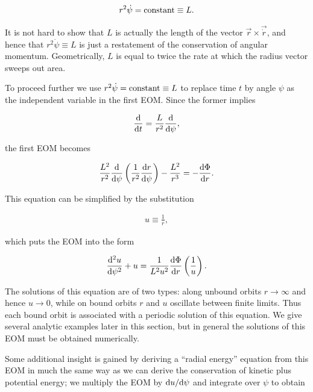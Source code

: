 \documentclass[a4paper,10pt]{article}
\begin{document}
\begin{align*}
    r^2\dot{\psi} = {\rm constant} \equiv L.
\end{align*}

{\noindent}It is not hard to show that $L$ is actually the length of the vector $\vec{r}\times\vec{\dot{r}}$, and hence that $r^2\dot{\psi}\equiv L$ is just a restatement of the conservation of angular momentum. Geometrically, $L$ is equal to twice the rate at which the radius vector sweeps out area.

{\noindent}To proceed further we use $r^2\dot{\psi} = {\rm constant} \equiv L$ to replace time $t$ by angle $\psi$ as the independent variable in the first EOM. Since the former implies

\begin{align*}
    \frac{{\rm d}}{{\rm d}t} = \frac{L}{r^2}\frac{{\rm d}}{{\rm d}\psi},
\end{align*}

{\noindent}the first EOM becomes

\begin{align*}
    \frac{L^2}{r^2}\frac{{\rm d}}{{\rm d}\psi} \left(\frac{1}{r^2}\frac{{\rm d}r}{{\rm d}\psi}\right) - \frac{L^2}{r^3} = -\frac{{\rm d}\Phi}{{\rm d}r}.
\end{align*}

{\noindent}This equation can be simplified by the substitution

\begin{align*}
    u\equiv\frac{1}{r},
\end{align*}

{\noindent}which puts the EOM into the form

\begin{align*}
    \frac{{\rm d}^2u}{{\rm d}\psi^2} + u = \frac{1}{L^2u^2}\frac{{\rm d}\Phi}{{\rm d}r}\left(\frac{1}{u}\right).
\end{align*}

{\noindent}The solutions of this equation are of two types: along unbound orbits $r\rightarrow\infty$ and hence $u\rightarrow0$, while on bound orbits $r$ and $u$ oscillate between finite limits. Thus each bound orbit is associated with a periodic solution of this equation. We give several analytic examples later in this section, but in general the solutions of this EOM must be obtained numerically.

{\noindent}Some additional insight is gained by deriving a ``radial energy'' equation from this EOM in much the same way as we can derive the conservation of kinetic plus potential energy; we multiply the EOM by ${\rm d}u/{\rm d}\psi$ and integrate over $\psi$ to obtain
\end{document}
